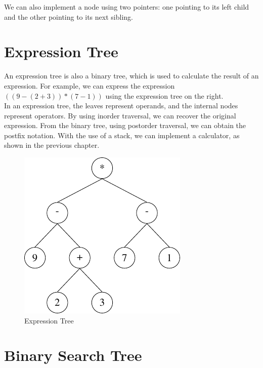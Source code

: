 We can also implement a node using two pointers: one pointing to its left child and the other pointing to its next sibling.

\section{Expression Tree}
\begin{minipage}{0.6\textwidth}
An expression tree is also a binary tree, which is used to calculate the result of an expression. For example, we can express the expression \(((9 - (2 + 3)) * (7 - 1))\) using the  expression tree on the right.\\[3pt]
In an expression tree, the leaves represent operands, and the internal nodes represent operators. By using inorder traversal, we can recover the original expression. From the binary tree, using postorder traversal, we can obtain the postfix notation. With the use of a stack, we can implement a calculator, as shown in the previous chapter.
\end{minipage}
\begin{minipage}{0.4\textwidth}
\begin{figure}[H]
  \centering
  \includegraphics[height=0.6\textwidth]{Figure/Expression-Tree.pdf}
  \caption{Expression Tree}
\end{figure}
\end{minipage}

\section{Binary Search Tree}
